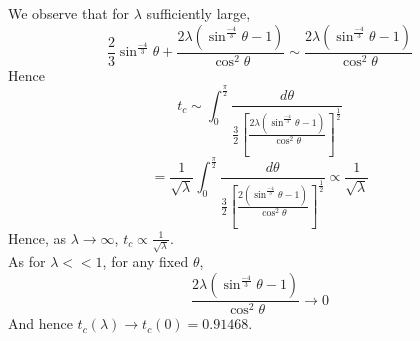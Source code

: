 \documentclass[10pt]{article}
\begin{document}
We observe that for $\lambda$ sufficiently large,
\[\frac{2}{3}\sin^{\frac{-4}{3}}\theta+\frac{2\lambda(\sin^{\frac{-4}{3}}\theta-1)}{\cos^2\theta}\sim\frac{2\lambda(\sin^{\frac{-4}{3}}\theta-1)}{\cos^2\theta}\]
Hence 
\[t_c \sim \int^{\frac{\pi}{2}}_0 \frac{d\theta}{\frac{3}{2}[\frac{2\lambda(\sin^{\frac{-4}{3}}\theta-1)}{\cos^2\theta}]^{\frac{1}{2}}}\]
\[ = \frac{1}{\sqrt{\lambda}} \int^{\frac{\pi}{2}}_0 \frac{d\theta}{\frac{3}{2}[\frac{2(\sin^{\frac{-4}{3}}\theta-1)}{\cos^2\theta}]^{\frac{1}{2}}} \propto \frac{1}{\sqrt{\lambda}}
\]
Hence, as $\lambda\to\infty$, \underline{$t_c\propto \frac{1}{\sqrt{\lambda}}$}.\\
As for $\lambda<<1$, for any fixed $\theta$,
\[\frac{2\lambda(\sin^{\frac{-4}{3}}\theta-1)}{\cos^2\theta}\to0\]
And hence $t_c(\lambda)\to t_c(0)=0.91468$.\\
\end{document}
